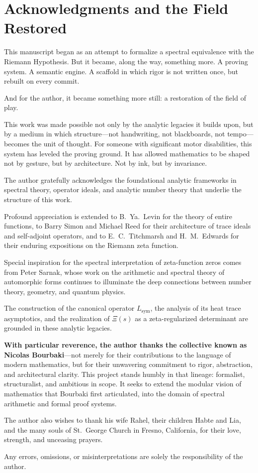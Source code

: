 \section*{Acknowledgments and the Field Restored}
\label{sec:epilogue_acknowledgments}

This manuscript began as an attempt to formalize a spectral equivalence with the Riemann Hypothesis. But it became, along the way, something more. A proving system. A semantic engine. A scaffold in which rigor is not written once, but rebuilt on every commit.

And for the author, it became something more still: a restoration of the field of play.

This work was made possible not only by the analytic legacies it builds upon, but by a medium in which structure—not handwriting, not blackboards, not tempo—becomes the unit of thought. For someone with significant motor disabilities, this system has leveled the proving ground. It has allowed mathematics to be shaped not by gesture, but by architecture. Not by ink, but by invariance.

\medskip

The author gratefully acknowledges the foundational analytic frameworks in spectral theory, operator ideals, and analytic number theory that underlie the structure of this work.

Profound appreciation is extended to B.~Ya.~Levin for the theory of entire functions, to Barry Simon and Michael Reed for their architecture of trace ideals and self-adjoint operators, and to E.~C.~Titchmarsh and H.~M.~Edwards for their enduring expositions on the Riemann zeta function.

Special inspiration for the spectral interpretation of zeta-function zeros comes from Peter Sarnak, whose work on the arithmetic and spectral theory of automorphic forms continues to illuminate the deep connections between number theory, geometry, and quantum physics.

The construction of the canonical operator \( L_{\mathrm{sym}} \), the analysis of its heat trace asymptotics, and the realization of \( \Xi(s) \) as a zeta-regularized determinant are grounded in these analytic legacies.

\medskip

\noindent
\textbf{With particular reverence, the author thanks the collective known as Nicolas Bourbaki}—not merely for their contributions to the language of modern mathematics, but for their unwavering commitment to rigor, abstraction, and architectural clarity. This project stands humbly in that lineage: formalist, structuralist, and ambitious in scope. It seeks to extend the modular vision of mathematics that Bourbaki first articulated, into the domain of spectral arithmetic and formal proof systems.

\medskip

\noindent
The author also wishes to thank his wife Rahel, their children Habte and Lia, and the many souls of St.~George Church in Fresno, California, for their love, strength, and unceasing prayers.

\medskip

\noindent
Any errors, omissions, or misinterpretations are solely the responsibility of the author.
